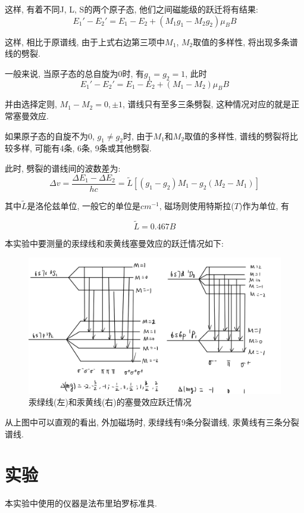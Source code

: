 \documentclass[12pt,a4paper]{article}
\newcommand{\be}[1]{
    \begin{equation}
        #1
    \end{equation}
}
\begin{document}
这样, 有着不同J, L, S的两个原子态, 他们之间磁能级的跃迁将有结果: 
\begin{equation}
    E_1'-E_2'=E_1-E_2+(M_1 g_1-M_2 g_2)\mu_{B}B
\end{equation}

这样, 相比于原谱线, 由于上式右边第三项中$M_1$, $M_2$取值的多样性, 将出现多条谱线的劈裂\cite{atomic_physics}. 

一般来说, 当原子态的总自旋为0时, 有$g_1=g_2=1$, 此时
\begin{equation}
    E_1'-E_2'=E_1-E_2+(M_1-M_2)\mu_{B}B
\end{equation}

并由选择定则, $M_1-M_2=0,\pm 1$, 谱线只有至多三条劈裂, 这种情况对应的就是正常塞曼效应. 

如果原子态的自旋不为0, $g_1\neq g_2$时, 由于$M_1$和$M_2$取值的多样性, 谱线的劈裂将比较多样, 可能有4条, 6条, 9条或其他劈裂. 

此时, 劈裂的谱线间的波数差为: 
\begin{equation}
    \Delta v=\frac{\Delta E_{1}-\Delta E_{2}}{h c}=\widetilde{L}\left[\left(g_{1}-g_{2}\right) M_{1}-g_{2}\left(M_{2}-M_{1}\right)\right]
\end{equation}

其中$\widetilde{L}$是洛伦兹单位, 一般它的单位是$cm^{-1}$, 磁场则使用特斯拉($T$)作为单位, 有

\be{\widetilde{L}=0.467B}

本实验中要测量的汞绿线和汞黄线塞曼效应的跃迁情况如下: 
\begin{figure}[H]
\centering
\includegraphics[width=\textwidth]{跃迁图.jpg}
\caption{汞绿线(左)和汞黄线(右)的塞曼效应跃迁情况}
\end{figure}

从上图中可以直观的看出, 外加磁场时, 汞绿线有9条分裂谱线, 汞黄线有三条分裂谱线. 
\section{实验}
本实验中使用的仪器是法布里珀罗标准具\cite{lecturenote}\cite{lecture}. 
\end{document}
